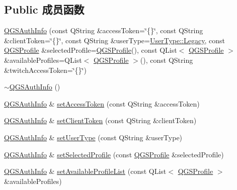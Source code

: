 \subsection*{Public 成员函数}
\begin{DoxyCompactItemize}
\item 
\mbox{\hyperlink{class_q_g_s_auth_info_a4c8bba8663da517cb1247ee7875fbce5}{Q\+G\+S\+Auth\+Info}} (const Q\+String \&access\+Token=\char`\"{}\{\}\char`\"{}, const Q\+String \&client\+Token=\char`\"{}\{\}\char`\"{}, const Q\+String \&user\+Type=\mbox{\hyperlink{namespace_user_type_a938c1c88af5b7d51492731caac017683}{User\+Type\+::\+Legacy}}, const \mbox{\hyperlink{class_q_g_s_auth_info_1_1_q_g_s_profile}{Q\+G\+S\+Profile}} \&selected\+Profile=\mbox{\hyperlink{class_q_g_s_auth_info_1_1_q_g_s_profile}{Q\+G\+S\+Profile}}(), const Q\+List$<$ \mbox{\hyperlink{class_q_g_s_auth_info_1_1_q_g_s_profile}{Q\+G\+S\+Profile}} $>$ \&available\+Profiles=Q\+List$<$ \mbox{\hyperlink{class_q_g_s_auth_info_1_1_q_g_s_profile}{Q\+G\+S\+Profile}} $>$(), const Q\+String \&twitch\+Access\+Token=\char`\"{}\{\}\char`\"{})
\item 
\mbox{\hyperlink{class_q_g_s_auth_info_abe2b5e9595bbb8937347d5593f734a4d}{$\sim$\+Q\+G\+S\+Auth\+Info}} ()
\item 
\mbox{\hyperlink{class_q_g_s_auth_info}{Q\+G\+S\+Auth\+Info}} \& \mbox{\hyperlink{class_q_g_s_auth_info_af18cfedbaebaf6e54f4ea519442d1979}{set\+Access\+Token}} (const Q\+String \&access\+Token)
\item 
\mbox{\hyperlink{class_q_g_s_auth_info}{Q\+G\+S\+Auth\+Info}} \& \mbox{\hyperlink{class_q_g_s_auth_info_a6f3d74c5fe35f13cf83c282b78e13e38}{set\+Client\+Token}} (const Q\+String \&client\+Token)
\item 
\mbox{\hyperlink{class_q_g_s_auth_info}{Q\+G\+S\+Auth\+Info}} \& \mbox{\hyperlink{class_q_g_s_auth_info_a93130d306eb0440ddfd1e573e781954c}{set\+User\+Type}} (const Q\+String \&user\+Type)
\item 
\mbox{\hyperlink{class_q_g_s_auth_info}{Q\+G\+S\+Auth\+Info}} \& \mbox{\hyperlink{class_q_g_s_auth_info_a1cd711296277e98ff3362ec84ac94436}{set\+Selected\+Profile}} (const \mbox{\hyperlink{class_q_g_s_auth_info_1_1_q_g_s_profile}{Q\+G\+S\+Profile}} \&selected\+Profile)
\item 
\mbox{\hyperlink{class_q_g_s_auth_info}{Q\+G\+S\+Auth\+Info}} \& \mbox{\hyperlink{class_q_g_s_auth_info_a1edc21d7b5f4a454575884a152f3f4d4}{set\+Available\+Profile\+List}} (const Q\+List$<$ \mbox{\hyperlink{class_q_g_s_auth_info_1_1_q_g_s_profile}{Q\+G\+S\+Profile}} $>$ \&available\+Profiles)

\end{DoxyCompactItemize}
